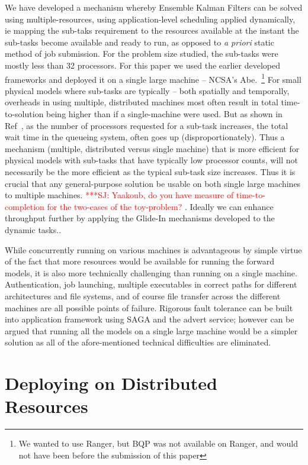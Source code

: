 \documentclass[conference,final]{IEEEtran}
\newcommand{\jhanote}[1]{ {\textcolor{red} { ***SJ: #1 }}}
\newcommand{\jhanote}[1]{}
\begin{document}
We have developed a mechanism whereby Ensemble Kalman Filters can be
solved using multiple-resources, using application-level scheduling
applied dynamically, ie mapping the sub-taks requirement to the
resources available at the instant the sub-tasks become available and
ready to run, as opposed to {\it a priori} static method of job
submission. For the problem size studied, the sub-tasks were mostly
less than 32 processors. For this paper we used the earlier developed
frameworks and deployed it on a single large machine -- NCSA's
Abe.~\footnote{We wanted to use Ranger, but BQP was not available on
  Ranger, and would not have been before the submission of this paper}
For small physical models where sub-tasks are typically -- both
spatially and temporally, overheads in using multiple, distributed
machines most often result in total time-to-solution being higher than
if a single-machine were used. But as shown in
Ref~\cite{novelsubmissionmode}, as the number of processors requested
for a sub-task increases, the total wait time in the queueing system,
often goes up (disproportionately). Thus a mechanism (multiple,
distributed versus single machine) that is more efficient for physical
models with sub-tasks that have typically low processor counts, will
not necessarily be the more efficient as the typical sub-task size
increases. Thus it is crucial that any general-purpose solution be
usable on both single large machines to multiple machines.
\jhanote{Yaakoub, do you have measure of time-to-completion for the
  two-cases of the toy-problem?}. Ideally we can enhance throughput
further by applying the Glide-In mechanisms developed to the dynamic
tasks..


While concurrently running on various machines is advantageous by
simple virtue of the fact that more resources would be available for
running the forward models, it is also more technically challenging
than running on a single machine.  Authentication, job launching,
multiple executables in correct paths for different architectures and
file systems, and of course file transfer across the different
machines are all possible points of failure. Rigorous fault tolerance
can be built into application framework using SAGA and the advert
service; however can be argued that running all the models on a single
large machine would be a simpler solution as all of the
afore-mentioned technical difficulties are eliminated.

\section{Deploying on Distributed Resources}
\end{document}
